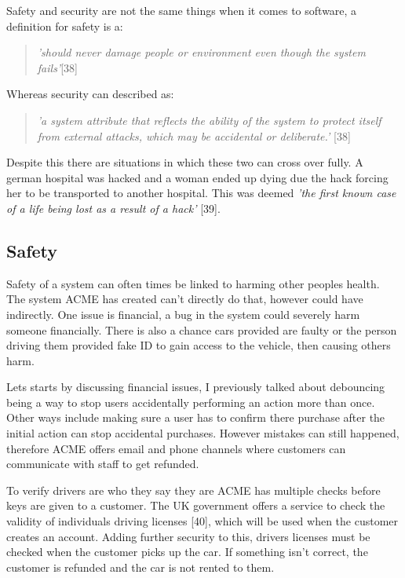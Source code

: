  Safety and security are not the same things when it comes to software, a definition for safety is a:
  \begin{quote}
    \textit{'should never damage people or environment even though the system fails'}[38]
  \end{quote}

  Whereas security can described as:
  \begin{quote}
    \textit{'a system attribute that reflects the ability of the system to protect itself from external attacks, which may be accidental or deliberate.'} [38]
  \end{quote}

  Despite this there are situations in which these two can cross over fully. A german hospital was hacked and a woman ended up dying due the hack forcing her 
  to be transported to another hospital. This was deemed \textit{'the first known case of a life being lost as a result of a hack'} [39].

  \subsection{Safety}
  Safety of a system can often times be linked to harming other peoples health. The system ACME has created can't directly do that, however could have 
  indirectly. One issue is financial, a bug in the system could severely harm someone financially. There is also a chance cars provided 
  are faulty or the person driving them provided fake ID to gain access to the vehicle, then causing others harm.

  Lets starts by discussing financial issues, I previously talked about debouncing being a way to stop users accidentally performing an action more than
  once. Other ways include making sure a user has to confirm there purchase after the initial action can stop accidental purchases. However mistakes can 
  still happened, therefore ACME offers email and phone channels where customers can communicate with staff to get refunded.

  To verify drivers are who they say they are ACME has multiple checks before keys are given to a customer. The UK government offers a service to check 
  the validity of individuals driving licenses [40], which will be used when the customer creates an account. Adding further security to this, drivers licenses
  must be checked when the customer picks up the car. If something isn't correct, the customer is refunded and the car is not rented to them.

